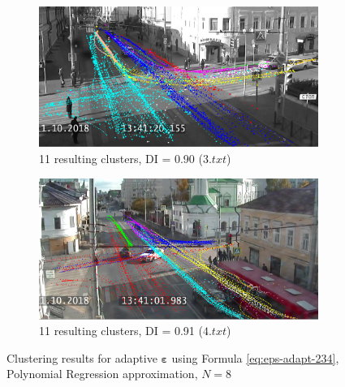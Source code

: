 \begin{figure}[!htb]
\begin{subfigure}[!htb]{0.23\textwidth}
		\includegraphics[width=\textwidth]{images/cl-res/clust-res-1-pr-diff-coeff-3.png}
		\caption{11 resulting clusters, DI = 0.90 ($3.txt$)}
		\label{fig:clust-res-1-pr-diff-coeff-3}
	\end{subfigure}
	\hfill
	\begin{subfigure}[!htb]{0.23\textwidth}
		\centering{}
		\includegraphics[width=\textwidth]{images/cl-res/clust-res-1-rdp-n-diff-coeff-4.png}
		\caption{11 resulting clusters, DI = 0.91 ($4.txt$)}
		\label{fig:clust-res-1-pr-diff-coeff-4}
	\end{subfigure}
	\caption{Clustering results for adaptive $\bm{\varepsilon}$ using Formula \ref{eq:eps-adapt-234}, Polynomial Regression approximation, $N = 8$}
	\label{fig:clust-res-1-pr-diff-coeff}
\end{figure}

